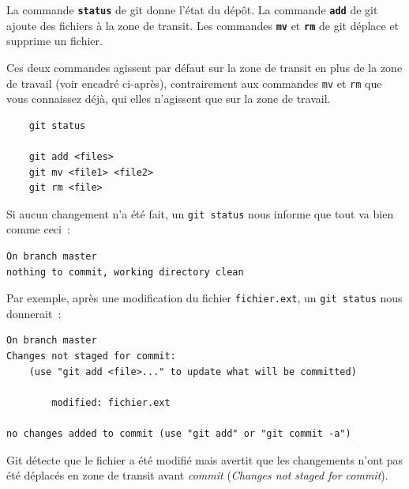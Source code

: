 \documentclass[a4paper,11pt]{style-esi/td}
\begin{document}
La commande \texttt{\textbf{status}} de git donne l'état du dépôt.
La commande \texttt{\textbf{add}} de git ajoute des fichiers à la zone de transit. Les commandes \texttt{\textbf{mv}} et \texttt{\textbf{rm}} de git déplace et supprime un fichier. 

Ces deux commandes agissent par défaut sur la zone de transit en plus de la zone de travail (voir encadré ci-après), contrairement aux commandes \texttt{mv} et \texttt{rm} que vous connaissez déjà, qui elles n'agissent que sur la zone de travail.

\bigskip
\begin{colxbox}[colback=white,drop fuzzy shadow]
	\begin{verbatim}
	git status

	git add <files>
	git mv <file1> <file2>
	git rm <file>
	\end{verbatim}
\end{colxbox}
\bigskip

Si aucun changement n'a été fait, un \texttt{git status} nous informe que tout va
bien comme ceci :

\begin{verbatim}
On branch master 
nothing to commit, working directory clean 
\end{verbatim}

Par exemple, après une modification du fichier \texttt{fichier.ext}, un
\texttt{git status} nous donnerait : 

\begin{verbatim}
On branch master 
Changes not staged for commit: 
    (use "git add <file>..." to update what will be committed) 

		modified: fichier.ext 

no changes added to commit (use "git add" or "git commit -a") 
\end{verbatim}

Git détecte que le fichier a été modifié mais avertit que les changements n’ont
pas été déplacés en zone de transit avant \textit{commit} (\textit{Changes not staged for
commit}). 
\end{document}
